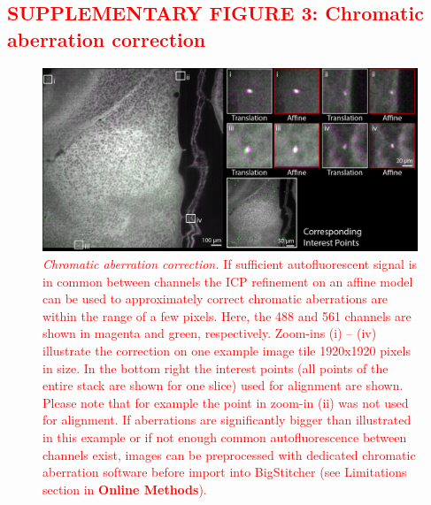 \documentclass[]{spie}  %
\def\red{\textcolor{red}}
\begin{document}
\pagebreak

\subsection*{\red{SUPPLEMENTARY FIGURE 3: Chromatic aberration correction}}
\vspace{1mm}
\begin{figure}[h!]
\includegraphics[width=\textwidth]{fig-chr_aberrations.jpg}
\vspace{-2.0mm}
\caption{\hspace{-0.5mm} \red{\emph{Chromatic aberration correction.} If sufficient autofluorescent signal is in common between channels the ICP refinement on an affine model can be used to approximately correct chromatic aberrations are within the range of a few pixels. Here, the 488 and 561 channels are shown in magenta and green, respectively. Zoom-ins (i) -- (iv) illustrate the correction on one example image tile 1920x1920 pixels in size. In the bottom right the interest points (all points of the entire stack are shown for one slice) used for alignment are shown. Please note that for example the point in zoom-in (ii) was not used for alignment. If aberrations are significantly bigger than illustrated in this example or if not enough common autofluorescence between channels exist, images can be preprocessed with dedicated chromatic aberration software before import into BigStitcher (see Limitations section in \textbf{Online Methods}).
}}
\label{fig:sup-chromatic}
\end{figure}

\pagebreak
\end{document}
